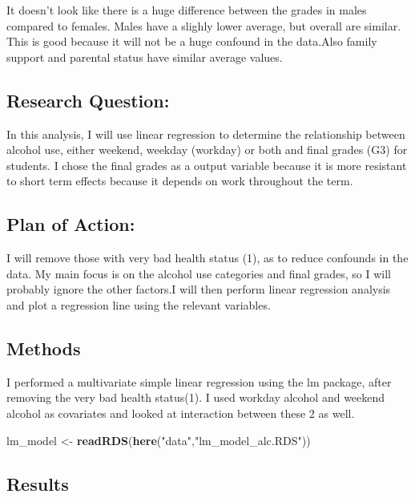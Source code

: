 \documentclass[]{article}
\newenvironment{Shaded}{\begin{snugshade}}{\end{snugshade}}
\newcommand{\KeywordTok}[1]{\textcolor[rgb]{0.13,0.29,0.53}{\textbf{#1}}}
\newcommand{\NormalTok}[1]{#1}
\newcommand{\StringTok}[1]{\textcolor[rgb]{0.31,0.60,0.02}{#1}}
\begin{document}
It doesn't look like there is a huge difference between the grades in
males compared to females. Males have a slighly lower average, but
overall are similar. This is good because it will not be a huge confound
in the data.Also family support and parental status have similar average
values.

\hypertarget{research-question}{%
\subsection{Research Question:}\label{research-question}}

In this analysis, I will use linear regression to determine the
relationship between alcohol use, either weekend, weekday (workday) or
both and final grades (G3) for students. I chose the final grades as a
output variable because it is more resistant to short term effects
because it depends on work throughout the term.

\hypertarget{plan-of-action}{%
\subsection{Plan of Action:}\label{plan-of-action}}

I will remove those with very bad health status (1), as to reduce
confounds in the data. My main focus is on the alcohol use categories
and final grades, so I will probably ignore the other factors.I will
then perform linear regression analysis and plot a regression line using
the relevant variables.

\hypertarget{methods}{%
\subsection{Methods}\label{methods}}

I performed a multivariate simple linear regression using the lm
package, after removing the very bad health status(1). I used workday
alcohol and weekend alcohol as covariates and looked at interaction
between these 2 as well.

\begin{Shaded}
\begin{Highlighting}[]
\NormalTok{lm_model <-}\StringTok{ }\KeywordTok{readRDS}\NormalTok{(}\KeywordTok{here}\NormalTok{(}\StringTok{"data"}\NormalTok{,}\StringTok{"lm_model_alc.RDS"}\NormalTok{))}
\end{Highlighting}
\end{Shaded}

\hypertarget{results}{%
\subsection{Results}\label{results}}
\end{document}
